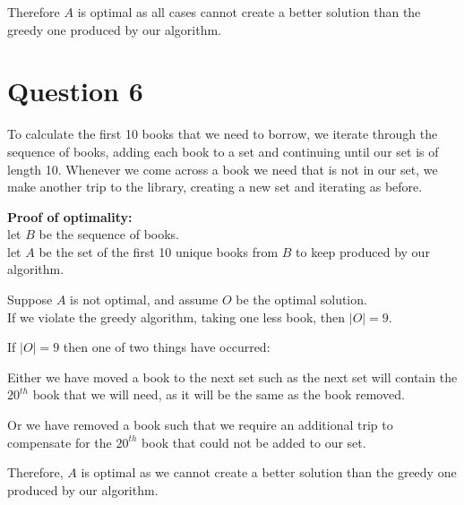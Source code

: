 \documentclass{article}
\begin{document}
Therefore $A$ is optimal as all cases cannot create a better solution than the greedy one produced by our algorithm.

\section*{Question 6}
To calculate the first 10 books that we need to borrow, we iterate through the sequence of books, adding each book to a set and continuing until our set is of length 10. Whenever we come across a book we need that is not in our set, we make another trip to the library, creating a new set and iterating as before.

\textbf{Proof of optimality:}\\
let $B$ be the sequence of books.\\
let $A$ be the set of the first 10 unique books from $B$ to keep produced by our algorithm.

Suppose $A$ is not optimal, and assume $O$ be the optimal solution.\\
If we violate the greedy algorithm, taking one less book, then $|O| = 9$.

If $|O| = 9$ then one of two things have occurred:

Either we have moved a book to the next set such as the next set will contain the $20^{th}$ book that we will need, as it will be the same as the book removed.

Or we have removed a book such that we require an additional trip to compensate for the $20^{th}$ book that could not be added to our set.

Therefore, $A$ is optimal as we cannot create a better solution than the greedy one produced by our algorithm.
\end{document}
